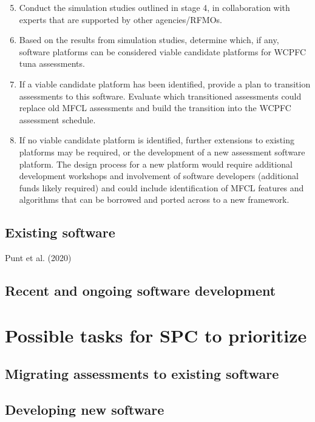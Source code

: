 \documentclass{SCreport}
\begin{document}
\begin{enumerate}\setcounter{enumi}{4}
  \item Conduct the simulation studies outlined in stage 4, in collaboration
  with experts that are supported by other agencies/RFMOs.
  \item Based on the results from simulation studies, determine which, if any,
  software platforms can be considered viable candidate platforms for WCPFC tuna
  assessments.
  \item If a viable candidate platform has been identified, provide a plan to
  transition assessments to this software. Evaluate which transitioned
  assessments could replace old MFCL assessments and build the transition into
  the WCPFC assessment schedule.
  \item If no viable candidate platform is identified, further extensions to
  existing platforms may be required, or the development of a new assessment
  software platform. The design process for a new platform would require
  additional development workshops and involvement of software developers
  (additional funds likely required) and could include identification of MFCL
  features and algorithms that can be borrowed and ported across to a new
  framework.
\end{enumerate}

\subsection{Existing software}

Punt et al. (2020)

\subsection{Recent and ongoing software development}

\section{Possible tasks for SPC to prioritize}

\subsection{Migrating assessments to existing software}

\subsection{Developing new software}
\end{document}
